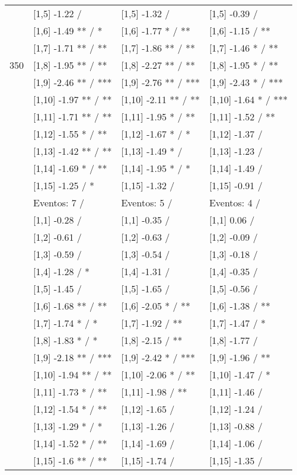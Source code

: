 \begin{table}
\begin{tabular}[t]{llll}
 & {}[1,5] -1.22  / & {}[1,5] -1.32  / & {}[1,5] -0.39  /\\
 & {}[1,6] -1.49 ** / * & {}[1,6] -1.77 * / ** & {}[1,6] -1.15  / **\\
 & {}[1,7] -1.71 ** / ** & {}[1,7] -1.86 ** / ** & {}[1,7] -1.46 * / **\\
350 & {}[1,8] -1.95 ** / ** & {}[1,8] -2.27 ** / ** & {}[1,8] -1.95 * / **\\
\addlinespace
 & {}[1,9] -2.46 ** / *** & {}[1,9] -2.76 ** / *** & {}[1,9] -2.43 * / ***\\
 & {}[1,10] -1.97 ** / ** & {}[1,10] -2.11 ** / ** & {}[1,10] -1.64 * / ***\\
 & {}[1,11] -1.71 ** / ** & {}[1,11] -1.95 * / ** & {}[1,11] -1.52  / **\\
 & {}[1,12] -1.55 * / ** & {}[1,12] -1.67 * / * & {}[1,12] -1.37  /\\
 & {}[1,13] -1.42 ** / ** & {}[1,13] -1.49 * / & {}[1,13] -1.23  /\\
\addlinespace
 & {}[1,14] -1.69 * / ** & {}[1,14] -1.95 * / * & {}[1,14] -1.49  /\\
 & {}[1,15] -1.25  / * & {}[1,15] -1.32  / & {}[1,15] -0.91  /\\
 & Eventos:  7 / & Eventos:  5 / & Eventos:  4 /\\
 & {}[1,1] -0.28  / & {}[1,1] -0.35  / & {}[1,1] 0.06  /\\
 & {}[1,2] -0.61  / & {}[1,2] -0.63  / & {}[1,2] -0.09  /\\
\addlinespace
 & {}[1,3] -0.59  / & {}[1,3] -0.54  / & {}[1,3] -0.18  /\\
 & {}[1,4] -1.28  / * & {}[1,4] -1.31  / & {}[1,4] -0.35  /\\
 & {}[1,5] -1.45  / & {}[1,5] -1.65  / & {}[1,5] -0.56  /\\
 & {}[1,6] -1.68 ** / ** & {}[1,6] -2.05 * / ** & {}[1,6] -1.38  / **\\
 & {}[1,7] -1.74 * / * & {}[1,7] -1.92  / ** & {}[1,7] -1.47  / *\\
\addlinespace
500 & {}[1,8] -1.83 * / * & {}[1,8] -2.15  / ** & {}[1,8] -1.77  /\\
 & {}[1,9] -2.18 ** / *** & {}[1,9] -2.42 * / *** & {}[1,9] -1.96  / **\\
 & {}[1,10] -1.94 ** / ** & {}[1,10] -2.06 * / ** & {}[1,10] -1.47  / *\\
 & {}[1,11] -1.73 * / ** & {}[1,11] -1.98  / ** & {}[1,11] -1.46  /\\
 & {}[1,12] -1.54 * / ** & {}[1,12] -1.65  / & {}[1,12] -1.24  /\\
\addlinespace
 & {}[1,13] -1.29 * / * & {}[1,13] -1.26  / & {}[1,13] -0.88  /\\
 & {}[1,14] -1.52 * / ** & {}[1,14] -1.69  / & {}[1,14] -1.06  /\\
 & {}[1,15] -1.6 ** / ** & {}[1,15] -1.74  / & {}[1,15] -1.35  /\\
\bottomrule
\end{tabular}
\end{table}
